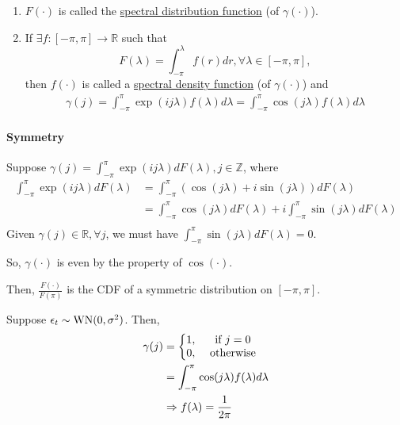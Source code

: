 \documentclass[11pt]{elegantbook}
\begin{document}
\begin{remark}
    \begin{enumerate}
        \item $F(\cdot)$ is called the \underline{spectral distribution function} (of $\gamma(\cdot)$).
        \item If $\exists f:[-\pi, \pi] \rightarrow \mathbb{R}$ such that $$F(\lambda)=\int_{-\pi}^\lambda f(r)d r, \forall \lambda\in[-\pi, \pi],$$
        then $f(\cdot)$ is called a \underline{spectral density function} (of $\gamma(\cdot)$) and
        \begin{equation}
            \begin{aligned}
                \gamma(j)=\int_{-\pi}^\pi \exp\left(ij\lambda\right)f(\lambda)d \lambda = \int_{-\pi}^\pi \cos(j\lambda) f(\lambda) d \lambda
            \end{aligned}
            \nonumber
        \end{equation}
    \end{enumerate}
\end{remark}


\paragraph*{Symmetry} Suppose $\gamma(j)=\int_{-\pi}^\pi \exp\left(ij\lambda\right)d F(\lambda),j\in \mathbb{Z}$, where
\begin{equation}
    \begin{aligned}
        \int_{-\pi}^\pi \exp\left(ij\lambda\right)d F(\lambda)&=\int_{-\pi}^\pi \left(\cos(j\lambda)+i\sin(j\lambda)\right)d F(\lambda)\\
        &=\int_{-\pi}^\pi \cos(j\lambda)d F(\lambda) + i\int_{-\pi}^\pi\sin(j\lambda)d F(\lambda)\\
    \end{aligned}
    \nonumber
\end{equation}
Given $\gamma(j)\in \mathbb{R},\forall j$, we must have $\int_{-\pi}^\pi\sin(j\lambda)d F(\lambda)=0.$

So, $\gamma(\cdot)$ is even by the property of $\cos(\cdot)$.

Then, $\frac{F(\cdot)}{F(\pi)}$ is the CDF of a symmetric distribution on $[-\pi, \pi]$.

\begin{example}
    Suppose $\epsilon_t\sim \textnormal{WN}(0,\sigma^2)$. Then,
    \begin{equation}
        \begin{aligned}
            \gamma(j)&=\left\{\begin{matrix}
                1,&\textnormal{ if }j=0\\
                0,&\textnormal{ otherwise}
            \end{matrix}\right.\\
            &=\int_{-\pi}^\pi \cos(j\lambda)f(\lambda) d \lambda\\
            &\Rightarrow f(\lambda)=\frac{1}{2\pi}
        \end{aligned}
        \nonumber
    \end{equation}
\end{example}
\end{document}
